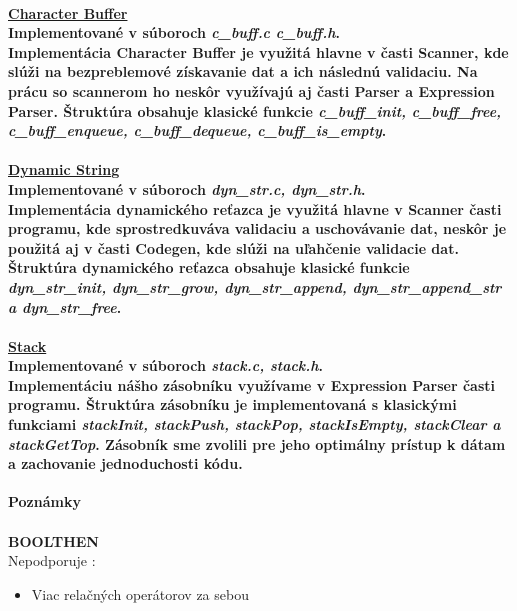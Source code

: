 \documentclass[12pt]{article}
\begin{document}
\paragraph{\large \underline{Character Buffer}\normalsize \\ Implementované v súboroch \textit{c\_buff.c c\_buff.h}. \\ \newline
Implementácia Character Buffer je využitá hlavne v časti Scanner, kde slúži na bezpreblemové získavanie dat a ich následnú validaciu. Na prácu so scannerom ho neskôr využívajú aj časti Parser a Expression Parser. Štruktúra obsahuje klasické funkcie \textit{c\_buff\_init, c\_buff\_free, c\_buff\_enqueue, c\_buff\_dequeue, c\_buff\_is\_empty}. 
\newline \\}

\paragraph{\large \underline{Dynamic String}\normalsize \\ Implementované v súboroch \textit{dyn\_str.c, dyn\_str.h}. \\ \newline
Implementácia dynamického reťazca je využitá hlavne v Scanner časti programu, kde sprostredkuváva validaciu a uschovávanie dat, neskôr je použitá aj v časti Codegen, kde slúži na uľahčenie validacie dat. Štruktúra dynamického reťazca obsahuje klasické funkcie \textit{dyn\_str\_init, dyn\_str\_grow, dyn\_str\_append, dyn\_str\_append\_str a dyn\_str\_free}.  
\newline \\}

\paragraph{\large \underline{Stack}\normalsize \\ Implementované v súboroch \textit{stack.c, stack.h}. \\ \newline
Implementáciu nášho zásobníku využívame v Expression Parser časti programu. Štruktúra zásobníku je implementovaná s klasickými funkciami \textit{stackInit, stackPush, stackPop, stackIsEmpty, stackClear a stackGetTop}. Zásobník sme zvolili pre jeho optimálny prístup k dátam a zachovanie jednoduchosti kódu.
\newline \\}

\newpage

 \Large \textbf{Poznámky}\normalsize \\
\noindent\makebox[\linewidth]{\rule{\textwidth}{0.4pt}}
\newline \\

\large
\noindent \textbf{BOOLTHEN} \newline \\
Nepodporuje : 
\normalsize
\begin{itemize}
\item Viac relačných operátorov za sebou
\end{itemize}
\medskip
\end{document}
